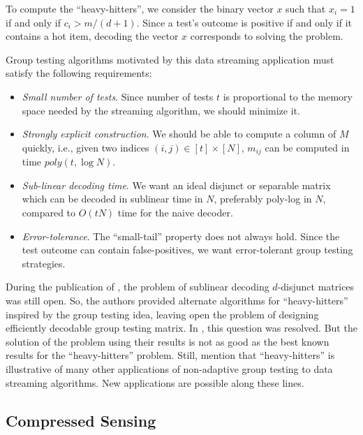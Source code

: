 \documentclass{article}
\begin{document}
To compute the ``heavy-hitters'', we consider the binary vector $x$
such that $x_i = 1$ if and only if $c_i > m/(d+1)$. Since a test's
outcome is positive if and only if it contains a hot item, decoding
the vector $x$ corresponds to solving the problem.

Group testing algorithms motivated by this data streaming application
must satisfy the following requirements:\cite{rudra709}

\begin{itemize}
\item \textsl{Small number of tests}. Since number of tests $t$ is proportional to
  the memory space needed by the streaming algorithm, we should minimize it.
\item \textsl{Strongly explicit construction}. We should be able to compute a column
  of $M$ quickly, i.e., given two indices $(i, j) \in [t] \times [N]$, $m_{ij}$ can be
  computed in time $poly(t, \log{N})$.
\item \textsl{Sub-linear decoding time}. We want an ideal disjunct or separable matrix
  which can be decoded in sublinear time in $N$, preferably poly-log in $N$, compared
  to $O(tN)$ time for the naive decoder.
\item \textsl{Error-tolerance}. The ``small-tail'' property does not always hold. Since
  the test outcome can contain false-positives, we want error-tolerant group testing strategies.
\end{itemize}

During the publication of \citeauthor*{cormode2005s}\cite{cormode2005s}, the problem of
sublinear decoding $d$-disjunct matrices was still open. So, the authors provided alternate
algorithms for ``heavy-hitters'' inspired by the group testing idea, leaving open the
problem of designing efficiently decodable group testing matrix. In \citeauthor*{indyk2010efficiently}
\cite{indyk2010efficiently}, this question was resolved. But the solution of the
problem using their results is not as good as the best known results for the
``heavy-hitters'' problem. Still, \citeauthor*{indyk2010efficiently}\cite{indyk2010efficiently}
mention that ``heavy-hitters'' is illustrative of many other applications of non-adaptive
group testing to data streaming algorithms. New applications are possible along
these lines.

\subsection{Compressed Sensing}
\end{document}
